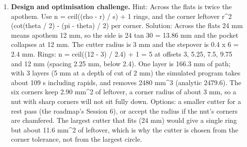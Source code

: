 \documentclass[11pt,a4paper]{article}
\begin{document}
\begin{enumerate}[nosep]
\item \textbf{Design and optimisation challenge.} Hint: Across the flats is twice the apothem. Use n = ceil((rho - r) / s) + 1 rings, and the corner leftover r\textasciicircum{}2 (cot(theta / 2) - (pi - theta) / 2) per corner. Solution: Across the flats 24 mm means apothem 12 mm, so the side is 24 tan 30 = 13.86 mm and the pocket collapses at 12 mm. The cutter radius is 3 mm and the stepover is 0.4 x 6 = 2.4 mm. Rings: n = ceil((12 - 3) / 2.4) + 1 = 5 at offsets 3, 5.25, 7.5, 9.75 and 12 mm (spacing 2.25 mm, below 2.4). One layer is 166.3 mm of path; with 3 layers (5 mm at a depth of cut of 2 mm) the simulated program takes about 109 s including rapids, and removes 2480 mm\textasciicircum{}3 (analytic 2479.6). The six corners keep 2.90 mm\textasciicircum{}2 of leftover, a corner radius of about 3 mm, so a nut with sharp corners will not sit fully down. Options: a smaller cutter for a rest pass (the roadmap's Session 6), or accept the radius if the nut's corners are chamfered. The largest cutter that fits (24 mm) would give a single ring but about 11.6 mm\textasciicircum{}2 of leftover, which is why the cutter is chosen from the corner tolerance, not from the largest circle.
\end{enumerate}
\end{document}
